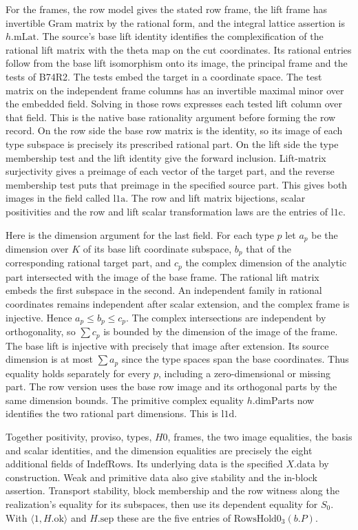 For the frames, the row model gives the stated row frame, the lift
frame has invertible Gram matrix by the rational form, and the
integral lattice assertion is $h.\mathrm{mLat}$. The source's
base lift identity identifies the complexification of the rational
lift matrix with the theta map on the cut coordinates. Its rational
entries follow from the base lift isomorphism onto its image, the
principal frame and the tests of B74R2. The tests embed the target
in a coordinate space. The test matrix on the independent frame
columns has an invertible maximal minor over the embedded field.
Solving in those rows expresses each tested lift column over that
field. This is the native base rationality argument before forming
the row record. On the row side
the base row matrix is the identity, so its image of each type
subspace is precisely its prescribed rational part. On the lift side
the type membership test and the lift identity give the forward
inclusion. Lift-matrix surjectivity gives a preimage of each vector of
the target part, and the reverse membership test puts that preimage
in the specified source part. This gives both images in the field
called $\mathrm{l1a}$. The row and lift matrix bijections, scalar
positivities and the row and lift scalar transformation laws are the
entries of $\mathrm{l1c}$.

Here is the dimension argument for the last field. For each type $p$
let $a_p$ be the dimension over $K$ of its base lift coordinate
subspace, $b_p$ that of the corresponding rational target part, and
$c_p$ the complex dimension of the analytic part intersected with
the image of the base frame. The rational lift matrix embeds the
first subspace in the second. An independent family in rational
coordinates remains independent after scalar extension, and the
complex frame is injective. Hence $a_p\le b_p\le c_p$.
The complex intersections are independent by orthogonality, so
$\sum c_p$ is bounded by the dimension of the image of the frame.
The base lift is injective with precisely that image after extension.
Its source dimension is at most $\sum a_p$ since the type spaces
span the base coordinates. Thus equality holds separately for every
$p$, including a zero-dimensional or missing part. The row version
uses the base row image and its orthogonal parts by the same dimension
bounds. The primitive complex equality $h.\mathrm{dimParts}$ now
identifies the two rational part dimensions. This is $\mathrm{l1d}$.

Together positivity, proviso, types, $H0$, frames, the two image
equalities, the basis and scalar identities, and the dimension
equalities are precisely the eight additional fields of
$\mathrm{IndefRows}$. Its underlying data is the specified $X.\mathrm{data}$
by construction. Weak and primitive data also give stability and
the in-block assertion. Transport stability, block membership and
the row witness along the realization's equality for its subspaces,
then use its dependent equality for $S_0$. With $\langle 1,H.\mathrm{ok}\rangle$
and $H.\mathrm{sep}$ these are the five entries of
$\mathrm{RowsHold0}_3(b.P)$.

